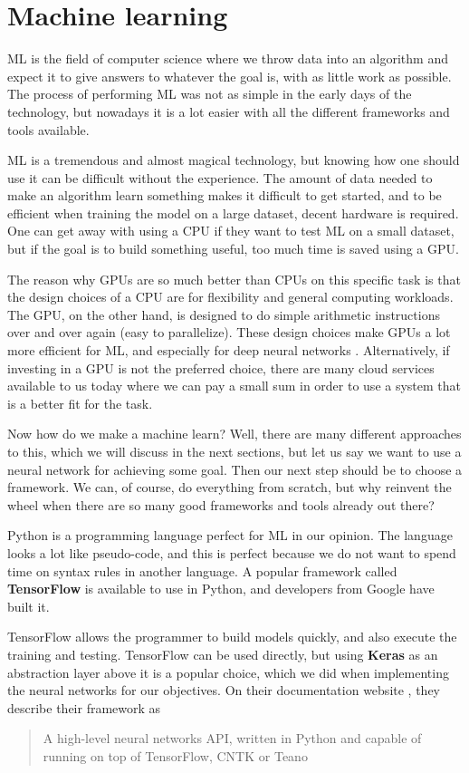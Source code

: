 \section{Machine learning}
ML is the field of computer science where we throw data into an algorithm and expect it to give answers to whatever the goal is, 
with as little work as possible. The process of performing ML was not as simple in the early days of the technology, 
but nowadays it is a lot easier with all the different frameworks and tools available.

ML is a tremendous and almost magical technology, but knowing how one should use it can be difficult without the experience. 
The amount of data needed to make an algorithm learn something makes it difficult to get started, and to be efficient when training the model on a large dataset, 
decent hardware is required. One can get away with using a CPU if they want to test ML on a small dataset, but if the goal is to build something useful, 
too much time is saved using a GPU. 

The reason why GPUs are so much better than CPUs on this specific task is that the design choices of a CPU are for flexibility and general computing workloads. 
The GPU, on the other hand, is designed to do simple arithmetic instructions over and over again (easy to parallelize). These design choices make GPUs a lot more 
efficient for ML, and especially for deep neural networks \cite{cpu_vs_gpu_ml}. Alternatively, if investing in a GPU is not the preferred choice, 
there are many cloud services available to us today where we can pay a small sum in order to use a system that is a better fit for the task.

Now how do we make a machine learn? Well, there are many different approaches to this, which we will discuss in the next sections, but let us say we want to 
use a neural network for achieving some goal. Then our next step should be to choose a framework. We can, of course, do everything from scratch, but why 
reinvent the wheel when there are so many good frameworks and tools already out there? 

Python is a programming language perfect for ML in our opinion. The language looks a lot like pseudo-code, and this is perfect because we do not 
want to spend time on syntax rules in another language. A popular framework called \textbf{TensorFlow} is available to use in Python, and developers from Google have built it. 

TensorFlow allows the programmer to build models quickly, and also execute the training and testing. TensorFlow can be used directly, but using \textbf{Keras} as an abstraction layer above it is a popular choice, which we did when implementing the neural networks for our objectives. On their documentation website \cite{keras_docs}, they describe their framework as \blockquote{A high-level neural networks API, written in Python and capable of running on top of TensorFlow, CNTK or Teano}.

